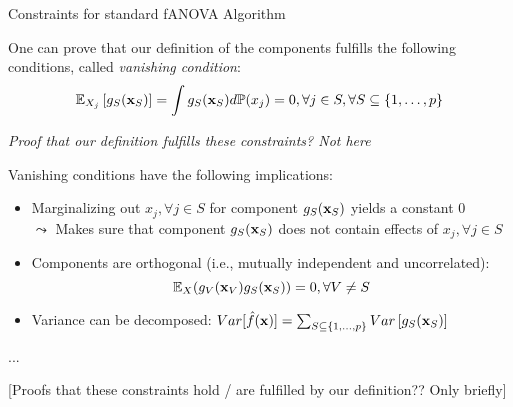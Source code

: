 \documentclass[11pt,compress,t,notes=noshow, aspectratio=169, xcolor=table]{beamer}
\begin{document}
\begin{frame}{Constraints for standard fANOVA Algorithm}

    One can prove that our definition of the components fulfills the following conditions, called \textit{vanishing condition}:
    \begin{equation*}
        \mathbb{E}_{X_j}\left[ g_{S}(\mathbf{x}_S) \right] = \int g_{S}(\mathbf{x}_S) d \mathbb{P}(x_j) = 0, \forall j \in S, \forall S \subseteq \{1, \ldots, p\}
    \end{equation*}


    \textit{Proof that our definition fulfills these constraints? Not here}
    
    \pause 
    
    Vanishing conditions have the following implications:
    
    \begin{itemize}
        \item Marginalizing out $x_j, \forall j \in S$ for component $g_S(\mathbf{x}_S)$ yields a constant 0\\
        $\leadsto$ Makes sure that component $g_S(\mathbf{x}_S)$ does not contain effects of $x_j, \forall j \in S$
        \item Components are orthogonal (i.e., mutually independent and uncorrelated):
        $$\mathbb{E}_{X} (g_{V}(\mathbf{x}_V) g_{S}(\mathbf{x}_S)) = 0, \forall V \neq S$$
        \item Variance can be decomposed:
    $ Var[\hat{f}(\mathbf{x})] =  \textstyle\sum_{S \subseteq \{1,\ldots,p\}}  Var\left[ g_{S}(\mathbf{x}_S)\right]$
    \end{itemize}
    
\end{frame}

\begin{frame}{...}

    [Proofs that these constraints hold / are fulfilled by our definition?? Only briefly]
    
\end{frame}
\end{document}
